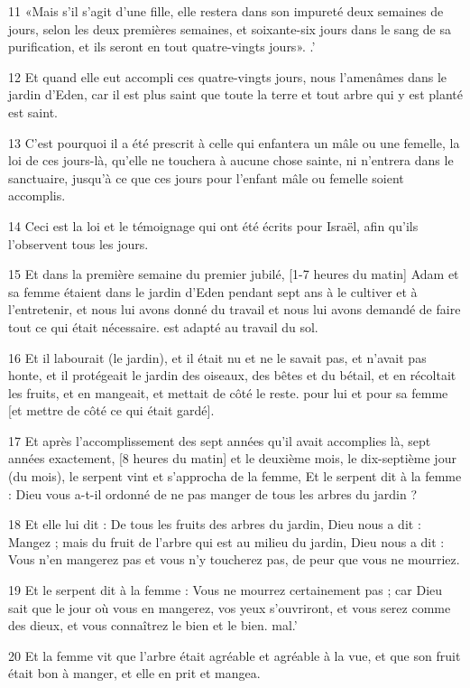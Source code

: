 \par 11 «Mais s'il s'agit d'une fille, elle restera dans son impureté deux semaines de jours, selon les deux premières semaines, et soixante-six jours dans le sang de sa purification, et ils seront en tout quatre-vingts jours». .'
\par 12 Et quand elle eut accompli ces quatre-vingts jours, nous l'amenâmes dans le jardin d'Eden, car il est plus saint que toute la terre et tout arbre qui y est planté est saint.
\par 13 C'est pourquoi il a été prescrit à celle qui enfantera un mâle ou une femelle, la loi de ces jours-là, qu'elle ne touchera à aucune chose sainte, ni n'entrera dans le sanctuaire, jusqu'à ce que ces jours pour l'enfant mâle ou femelle soient accomplis.
\par 14 Ceci est la loi et le témoignage qui ont été écrits pour Israël, afin qu'ils l'observent tous les jours.
\par 15 Et dans la première semaine du premier jubilé, [1-7 heures du matin] Adam et sa femme étaient dans le jardin d'Eden pendant sept ans à le cultiver et à l'entretenir, et nous lui avons donné du travail et nous lui avons demandé de faire tout ce qui était nécessaire. est adapté au travail du sol.
\par 16 Et il labourait (le jardin), et il était nu et ne le savait pas, et n'avait pas honte, et il protégeait le jardin des oiseaux, des bêtes et du bétail, et en récoltait les fruits, et en mangeait, et mettait de côté le reste. pour lui et pour sa femme [et mettre de côté ce qui était gardé].
\par 17 Et après l'accomplissement des sept années qu'il avait accomplies là, sept années exactement, [8 heures du matin] et le deuxième mois, le dix-septième jour (du mois), le serpent vint et s'approcha de la femme, Et le serpent dit à la femme : Dieu vous a-t-il ordonné de ne pas manger de tous les arbres du jardin ?
\par 18 Et elle lui dit : De tous les fruits des arbres du jardin, Dieu nous a dit : Mangez ; mais du fruit de l'arbre qui est au milieu du jardin, Dieu nous a dit : Vous n'en mangerez pas et vous n'y toucherez pas, de peur que vous ne mourriez.
\par 19 Et le serpent dit à la femme : Vous ne mourrez certainement pas ; car Dieu sait que le jour où vous en mangerez, vos yeux s'ouvriront, et vous serez comme des dieux, et vous connaîtrez le bien et le bien. mal.'
\par 20 Et la femme vit que l'arbre était agréable et agréable à la vue, et que son fruit était bon à manger, et elle en prit et mangea.

